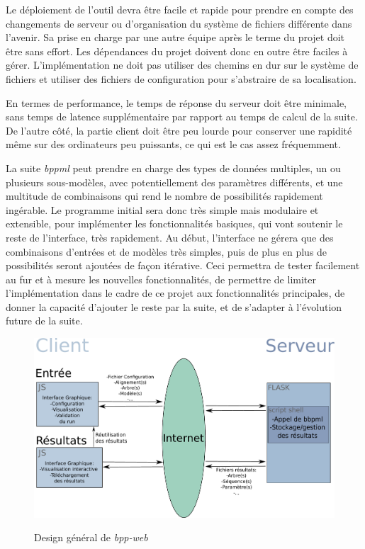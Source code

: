 Le déploiement de l'outil devra être facile et rapide
pour prendre en compte des changements de serveur
ou d'organisation du système de fichiers différente dans l'avenir.
Sa prise en charge par une autre équipe après le terme du projet
doit être sans effort.
Les dépendances du projet doivent donc en outre
être faciles à gérer.
L'implémentation ne doit pas utiliser des chemins en dur sur le système de fichiers
et utiliser des fichiers de configuration
pour s'abstraire de sa localisation.

En termes de performance,
le temps de réponse du serveur doit être minimale,
sans temps de latence supplémentaire par rapport au temps de calcul de la suite.
De l'autre côté, la partie client doit être peu lourde
pour conserver une rapidité même sur des ordinateurs peu puissants,
ce qui est le cas assez fréquemment.

La suite \textit{bppml} peut prendre en charge
des types de données multiples, un ou plusieurs sous-modèles,
avec potentiellement des paramètres différents,
et une multitude de combinaisons
qui rend le nombre de possibilités rapidement ingérable.
Le programme initial sera donc très simple mais modulaire et extensible,
pour implémenter les fonctionnalités basiques,
qui vont soutenir le reste de l'interface,
très rapidement.
Au début, l'interface ne gérera que
des combinaisons d'entrées et de modèles très simples,
puis de plus en plus de possibilités seront ajoutées de façon itérative.
Ceci permettra
de tester facilement au fur et à mesure les nouvelles fonctionnalités,
de permettre de limiter l'implémentation dans le cadre de ce projet
aux fonctionnalités principales,
de donner la capacité d'ajouter le reste par la suite,
et de s'adapter à l'évolution future de la suite.

\begin{figure}
	\caption{Design général de \textit{bpp-web}}
	\includegraphics[scale=0.5]{fig/SchemaConcept.pdf}
	\centering
	\label{fig:des}
\end{figure}


